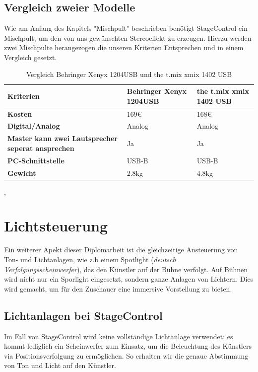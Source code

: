 \subsection{Vergleich zweier Modelle}
Wie am Anfang des Kapitels "Mischpult" beschrieben benötigt StageControl ein Mischpult, um den von uns gewünschten Stereoeffekt zu erzeugen. Hierzu werden zwei Mischpulte herangezogen die unseren Kriterien Entsprechen und in einem Vergleich gesetzt.

\begin{table} [H]
	\begin{tabular}{ |p{3.1cm} |p{4.8cm}|p{4.8cm}| }
		\hline
		\textbf{Kriterien} & \textbf{Behringer Xenyx 1204USB}& \textbf{the t.mix xmix 1402 USB}\\
		\hline
		\textbf{Kosten} & 169€ & 168€  \\ 
		\hline
		\textbf{Digital/Analog} & Analog & Analog   \\  
		\hline
		\textbf{Master kann zwei Lautsprecher seperat ansprechen} & Ja & Ja \\
		\hline
		\textbf{PC-Schnittstelle} & USB-B & USB-B  \\
		\hline
		\textbf{Gewicht}& 2.8kg & 4.8kg \\
		\hline	
	\end{tabular}
	\caption{Vergleich Behringer Xenyx 1204USB und the t.mix xmix 1402 USB} 
\end{table} 
\cite{Mischpult_Kriterien_1204}, \cite{Mischpult_Kriterien_1402}

\section{Lichtsteuerung}
Ein weiterer Apekt dieser Diplomarbeit ist die gleichzeitige Ansteuerung von Ton- und Lichtanlagen, wie z.b einem Spotlight (\emph{deutsch Verfolgungsscheinwerfer}), das den Künstler auf der Bühne verfolgt. Auf Bühnen wird nicht nur ein Sporlight eingesetzt, sondern ganze Anlagen von Lichtern. Dies wird gemacht, um für den Zuschauer eine immersive Vorstellung zu bieten. 

\subsection{Lichtanlagen bei StageControl}
Im Fall von StageControl wird keine vollständige Lichtanlage verwendet; es kommt lediglich ein Scheinwerfer zum Einsatz, um die Beleuchtung des Künstlers via Positionsverfolgung zu ermöglichen. So erhalten wir die genaue Abstimmung von Ton und Licht auf den Künstler.

